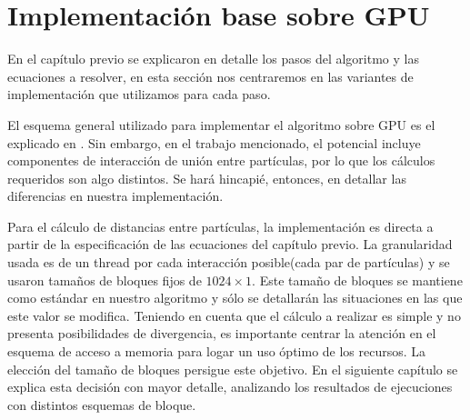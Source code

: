 



\section{Implementación base sobre GPU}
En el capítulo previo se explicaron en detalle los pasos del algoritmo y las ecuaciones a resolver, en esta sección nos centraremos en las variantes de implementación que utilizamos para cada paso.

El esquema general utilizado para implementar el algoritmo sobre GPU es el explicado en \cite{friedrichs2009accelerating}. 
Sin embargo, en el trabajo mencionado, el potencial incluye componentes de interacción de unión entre partículas, por lo que los cálculos requeridos son algo distintos. 
Se hará hincapié, entonces, en detallar las diferencias en nuestra implementación.

Para el cálculo de distancias entre partículas, la implementación es directa a partir de la especificación de las ecuaciones del capítulo previo. 
La granularidad usada es de un thread por cada interacción posible(cada par de partículas) y se usaron tamaños de bloques fijos de $1024\times1$.
Este tamaño de bloques se mantiene como estándar en nuestro algoritmo y sólo se detallarán las situaciones en las que este valor se modifica.
Teniendo en cuenta que el cálculo a realizar es simple y no presenta posibilidades de divergencia, es importante centrar la atención en el esquema de acceso a memoria para logar un uso óptimo de los recursos.
La elección del tamaño de bloques persigue este objetivo. En el siguiente capítulo se explica esta decisión con mayor detalle, analizando los resultados de ejecuciones con distintos esquemas de bloque. 


